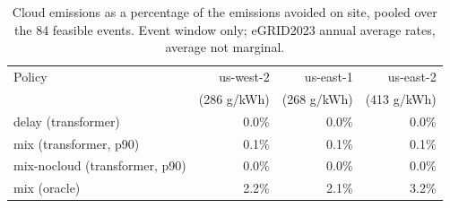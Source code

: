 \begin{table}[t]
\centering
\caption{Cloud emissions as a percentage of the emissions avoided on site, pooled over the 84 feasible events. Event window only; eGRID2023 annual average rates, average not marginal.}
\label{tab:carbon}
\begin{tabular}{lrrr}
\toprule
Policy & us-west-2 & us-east-1 & us-east-2 \\
 & (286 g/kWh) & (268 g/kWh) & (413 g/kWh) \\
\midrule
delay (transformer) & 0.0\% & 0.0\% & 0.0\% \\
mix (transformer, p90) & 0.1\% & 0.1\% & 0.1\% \\
mix-nocloud (transformer, p90) & 0.0\% & 0.0\% & 0.0\% \\
mix (oracle) & 2.2\% & 2.1\% & 3.2\% \\
\bottomrule
\end{tabular}
\end{table}
